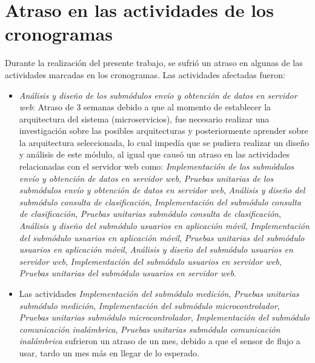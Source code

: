 \section{Atraso en las actividades de los cronogramas}\label{anexo:atraso}
Durante la realización del presente trabajo, se sufrió un atraso en algunas de las actividades marcadas en los cronogramas. Las actividades afectadas fueron:
\begin{itemize}
	\item \textit{Análisis y diseño de los submódulos envío y obtención de datos en servidor web}: Atraso de 3 semanas debido a que al momento de establecer la arquitectura del sistema (microservicios), fue necesario realizar una investigación sobre las posibles arquitecturas y posteriormente aprender sobre la arquitectura seleccionada, lo cual impedía que se pudiera realizar un diseño y análisis de este módulo, al igual que causó un atraso en las actividades relacionadas con el servidor web como: \textit{Implementación de los submódulos envío y obtención de datos en servidor web}, \textit{Pruebas unitarias de los submódulos envío y obtención de datos en servidor web}, \textit{Análisis y diseño del submódulo consulta de clasificación}, \textit{Implementación del submódulo consulta de clasificación}, \textit{Pruebas unitarias submódulo consulta de clasificación}, \textit{Análisis y diseño del submódulo usuarios en aplicación móvil}, \textit{Implementación del submódulo usuarios en aplicación móvil}, \textit{Pruebas unitarias del submódulo usuarios en aplicación móvil}, \textit{Análisis y diseño del submódulo usuarios en servidor web}, \textit{Implementación del submódulo usuarios en servidor web}, \textit{Pruebas unitarias del submódulo usuarios en servidor web}.
	\item Las actividades \textit{Implementación del submódulo medición}, \textit{Pruebas unitarias submódulo medición}, \textit{Implementación del submódulo microcontrolador}, \textit{Pruebas unitarias submódulo microcontrolador}, \textit{Implementación del submódulo comunicación inalámbrica}, \textit{Pruebas unitarias submódulo comunicación inalámbrica} sufrieron un atraso de un mes, debido a que el sensor de flujo a usar, tardo un mes más en llegar de lo esperado.
\end{itemize}